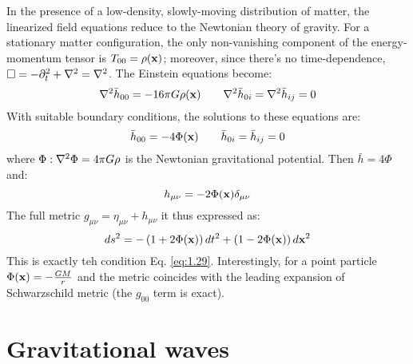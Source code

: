 In the presence of a low-density, slowly-moving distribution of matter, the linearized field equations reduce to the Newtonian theory of gravity. For a stationary matter configuration, the only non-vanishing component of the energy-momentum tensor is $ T_{00} = \rho(\mathbf{x}) $; moreover, since there's no time-dependence, $ \Box = -\partial_t^2 + \nabla^2 = \nabla^2 $. The Einstein equations become:
\begin{equation*}
  \nabla^2 \bar{h}_{00} = -16\pi G \rho(\mathbf{x})
  \qquad
  \nabla^2 \bar{h}_{0i} = \nabla^2 \bar{h}_{ij} = 0
\end{equation*}
With suitable boundary conditions, the solutions to these equations are:
\begin{equation*}
  \bar{h}_{00} = -4 \Phi(\mathbf{x})
  \qquad
  \bar{h}_{0i} = \bar{h}_{ij} = 0
\end{equation*}
where $ \Phi : \nabla^2 \Phi = 4\pi G \rho $ is the Newtonian gravitational potential. Then $ \bar{h} = 4 \Phi $ and:
\begin{equation*}
  h_{\mu \nu} = -2\Phi(\mathbf{x}) \delta_{\mu \nu}
\end{equation*}
The full metric $ g_{\mu \nu} = \eta_{\mu \nu} + h_{\mu \nu} $ it thus expressed as:
\begin{equation*}
  ds^2 = - \left( 1 + 2\Phi(\mathbf{x}) \right) dt^2 + \left( 1 - 2\Phi(\mathbf{x}) \right) d\mathbf{x}^2
\end{equation*}
This is exactly teh condition Eq. \ref{eq:1.29}. Interestingly, for a point particle $ \Phi(\mathbf{x}) = - \frac{GM}{r} $ and the metric coincides with the leading expansion of Schwarzschild metric (the $ g_{00} $ term is exact).

\section{Gravitational waves}


